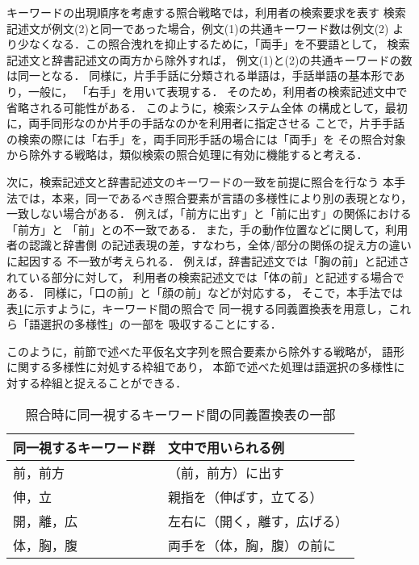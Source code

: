 キーワードの出現順序を考慮する照合戦略では，利用者の検索要求を表す
検索記述文が例文(2)と同一であった場合，例文(1)の共通キーワード数は例文(2)
より少なくなる．この照合洩れを抑止するために，「両手」を不要語として，
検索記述文と辞書記述文の両方から除外すれば，
例文(1)と(2)の共通キーワードの数は同一となる．
同様に，片手手話に分類される単語は，手話単語の基本形であり，一般に，
「右手」を用いて表現する．
そのため，利用者の検索記述文中で省略される可能性がある．
このように，検索システム全体
の構成として，最初に，両手同形なのか片手の手話なのかを利用者に指定させる
ことで，片手手話の検索の際には「右手」を，両手同形手話の場合には「両手」を
その照合対象から除外する戦略は，類似検索の照合処理に有効に機能すると考える．

次に，検索記述文と辞書記述文のキーワードの一致を前提に照合を行なう
本手法では，本来，同一であるべき照合要素が言語の多様性により別の表現となり，
一致しない場合がある．
例えば，「前方に出す」と「前に出す」の関係における「前方」と
「前」との不一致である．
また，手の動作位置などに関して，利用者の認識と辞書側
の記述表現の差，すなわち，全体/部分の関係の捉え方の違いに起因する
不一致が考えられる．
例えば，辞書記述文では「胸の前」と記述されている部分に対して，
利用者の検索記述文では「体の前」と記述する場合である．
同様に，「口の前」と「顔の前」などが対応する，
そこで，本手法では表\ref{dougi}に示すように，キーワード間の照合で
同一視する同義置換表を用意し，これら「語選択の多様性」の一部を
吸収することにする．

このように，前節で述べた平仮名文字列を照合要素から除外する戦略が，
語形に関する多様性に対処する枠組であり，
本節で述べた処理は語選択の多様性に対する枠組と捉えることができる．


\begin{table}[htbp]
\caption{照合時に同一視するキーワード間の同義置換表の一部}
\label{dougi}
\begin{center}
\footnotesize\tabcolsep=3pt
\begin{tabular}{l|l}\hline
同一視するキーワード群   & 文中で用いられる例   \\ \hline\hline
前，前方      & （前，前方）に出す \\ \hline
伸，立        & 親指を（伸ばす，立てる） \\ \hline
開，離，広    & 左右に（開く，離す，広げる） \\ \hline
体，胸，腹    & 両手を（体，胸，腹）の前に\\ \hline
\end{tabular}
\end{center}
\end{table}


